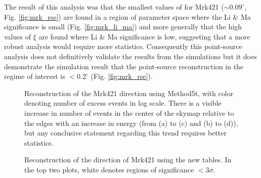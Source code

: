 \documentclass[main.tex]{subfiles}
\begin{document}
The result of this analysis was that the smallest values of \rse for Mrk421 ($\sim 0.09^\circ$, Fig. \ref{fig:mrk_rse}) are found in a region of parameter space where the Li \& Ma significance is small (Fig. \ref{fig:mrk_li_ma}) and more generally that the high values of $\xi$ are found where Li \& Ma significance is low, suggesting that a more robust analysis would require more statistics. Consequently this point-source analysis does not definitively validate the results from the simulations but it does demonstrate the simulation result that the point-source reconstruction in the regime of interest is $<0.2^\circ$ (Fig. \ref{fig:mrk_rse}).

\begin{figure}[H]
  \begin{center}
  \end{center}
  \caption[Mrk421 skymaps using the new \disp tables.]{Reconstruction of the Mrk421 direction using Method5t, with color denoting number of excess events in log scale. There is a visible increase in number of events in the center of the skymap relative to the edges with an increase in energy (from (a) to (c) and (b) to (d)), but any conclusive statement regarding this trend requires better statistics.}
  \label{fig:Mrk421_skymaps}
\end{figure}

\begin{figure}[H]
  \begin{center}
  \end{center}
  \caption[Mrk421 direction reconstruction using Method5t.]{Reconstruction of the direction of Mrk421 using the new \disp tables. In the top two plots, white denotes regions of significance $<3\sigma$.}
  \label{fig:mrk_disp}
\end{figure}
\end{document}
